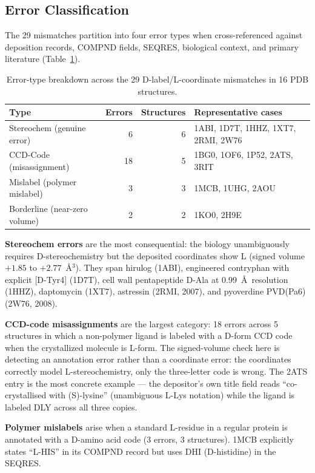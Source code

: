 \documentclass[11pt]{article}
\begin{document}
\subsection{Error Classification}

The 29 mismatches partition into four error types when cross-referenced against deposition records, COMPND fields, SEQRES, biological context, and primary literature (Table~\ref{tab:errtypes}).

\begin{table}[ht]
\centering
\caption{Error-type breakdown across the 29 D-label/L-coordinate mismatches in 16 PDB structures.}
\label{tab:errtypes}
\begin{tabular}{lrrl}
\toprule
Type & Errors & Structures & Representative cases \\
\midrule
Stereochem (genuine error)    & 6  & 6 & 1ABI, 1D7T, 1HHZ, 1XT7, 2RMI, 2W76 \\
CCD-Code (misassignment)      & 18 & 5 & 1BG0, 1OF6, 1P52, 2ATS, 3RIT \\
Mislabel (polymer mislabel)   & 3  & 3 & 1MCB, 1UHG, 2AOU \\
Borderline (near-zero volume) & 2  & 2 & 1KO0, 2H9E \\
\bottomrule
\end{tabular}
\end{table}

\textbf{Stereochem errors} are the most consequential: the biology unambiguously requires D-stereochemistry but the deposited coordinates show L (signed volume $+1.85$ to $+2.77$~\AA$^3$). They span hirulog (1ABI), engineered contryphan with explicit [D-Tyr4] (1D7T), cell wall pentapeptide D-Ala at 0.99~\AA\ resolution (1HHZ), daptomycin (1XT7), astressin (2RMI, 2007), and pyoverdine PVD(Pa6) (2W76, 2008).

\textbf{CCD-code misassignments} are the largest category: 18 errors across 5 structures in which a non-polymer ligand is labeled with a D-form CCD code when the crystallized molecule is L-form. The signed-volume check here is detecting an annotation error rather than a coordinate error: the coordinates correctly model L-stereochemistry, only the three-letter code is wrong. The 2ATS entry is the most concrete example --- the depositor's own title field reads ``co-crystallised with (S)-lysine'' (unambiguous L-Lys notation) while the ligand is labeled DLY across all three copies.

\textbf{Polymer mislabels} arise when a standard L-residue in a regular protein is annotated with a D-amino acid code (3 errors, 3 structures). 1MCB explicitly states ``L-HIS'' in its COMPND record but uses DHI (D-histidine) in the SEQRES.
\end{document}

